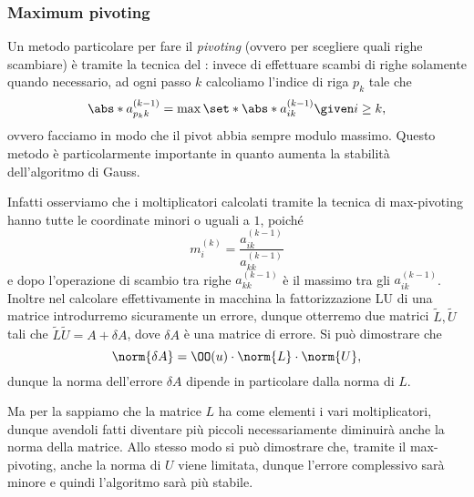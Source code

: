 \subsubsection{Maximum pivoting}

Un metodo particolare per fare il \emph{pivoting} (ovvero per scegliere quali righe scambiare) è tramite la tecnica del : invece di effettuare scambi di righe solamente quando necessario, ad ogni passo $k$ calcoliamo l'indice di riga $p_k$ tale che \[
    \abs*{a_{p_kk}^{(k-1)}} = \max \set*{\abs*{a_{ik}^{(k-1)}} \given i \geq k},
\] ovvero facciamo in modo che il pivot abbia sempre modulo massimo. Questo metodo è particolarmente importante in quanto aumenta la stabilità dell'algoritmo di Gauss.

Infatti osserviamo che i moltiplicatori calcolati tramite la tecnica di max-pivoting hanno tutte le coordinate minori o uguali a $1$, poiché \[
    m_{i}^{(k)} = \frac{a_{ik}^{(k-1)}}{a_{kk}^{(k-1)}}
\] e dopo l'operazione di scambio tra righe $a_{kk}^{(k-1)}$ è il massimo tra gli $a_{ik}^{(k-1)}$. Inoltre nel calcolare effettivamente in macchina la fattorizzazione LU di una matrice introdurremo sicuramente un errore, dunque otterremo due matrici $\widetilde{L}, \widetilde{U}$ tali che $\widetilde{L}\widetilde{U} = A + \delta A$, dove $\delta A$ è una matrice di errore. Si può dimostrare che \[
    \norm{\delta A} = \OO(u) \cdot \norm{L} \cdot \norm{U},
\] dunque la norma dell'errore $\delta A$ dipende in particolare dalla norma di $L$. 

Ma per la  sappiamo che la matrice $L$ ha come elementi i vari moltiplicatori, dunque avendoli fatti diventare più piccoli necessariamente diminuirà anche la norma della matrice. Allo stesso modo si può dimostrare che, tramite il max-pivoting, anche la norma di $U$ viene limitata, dunque l'errore complessivo sarà minore e quindi l'algoritmo sarà più stabile.